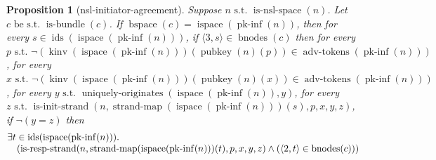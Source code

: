 \documentclass[11pt]{article}
\theoremstyle{plain}
\newtheorem*{proposition*}{Proposition}
\begin{document}
\begin{proposition*}[nsl-initiator-agreement]
Suppose $n \text{ s.t. } \operatorname{is\text{-}nsl\text{-}space}(n)$. Let $c \text{ be s.t. } \operatorname{is\text{-}bundle}(c)$. If $\operatorname{bspace}(c) = \operatorname{ispace}(\operatorname{pk\text{-}inf}(n))$, then for every $s \in \operatorname{ids}(\operatorname{ispace}(\operatorname{pk\text{-}inf}(n)))$, if $\langle 3, s \rangle \in \operatorname{bnodes}(c)$ then for every $p \text{ s.t. } \neg (\operatorname{kinv}(\operatorname{ispace}(\operatorname{pk\text{-}inf}(n)))(\operatorname{pubkey}(n)(p)) \in \operatorname{adv\text{-}tokens}(\operatorname{pk\text{-}inf}(n)))$, for every $x \text{ s.t. } \neg (\operatorname{kinv}(\operatorname{ispace}(\operatorname{pk\text{-}inf}(n)))(\operatorname{pubkey}(n)(x)) \in \operatorname{adv\text{-}tokens}(\operatorname{pk\text{-}inf}(n)))$, for every $y \text{ s.t. } \operatorname{uniquely\text{-}originates}(\operatorname{ispace}(\operatorname{pk\text{-}inf}(n)), y)$, for every $z \text{ s.t. } \operatorname{is\text{-}init\text{-}strand}(n, \operatorname{strand\text{-}map}(\operatorname{ispace}(\operatorname{pk\text{-}inf}(n)))(s), p, x, y, z)$, if $\neg (y = z)$ then 
\begin{equation*}
\begin{array}{@{}l@{}} \exists t \in \operatorname{ids}(\operatorname{ispace}(\operatorname{pk\text{-}inf}(n))). \\ \quad (\operatorname{is\text{-}resp\text{-}strand}(n, \operatorname{strand\text{-}map}(\operatorname{ispace}(\operatorname{pk\text{-}inf}(n)))(t), p, x, y, z) \wedge (\langle 2, t \rangle \in \operatorname{bnodes}(c))) \end{array}
\end{equation*}

\end{proposition*}
\end{document}
